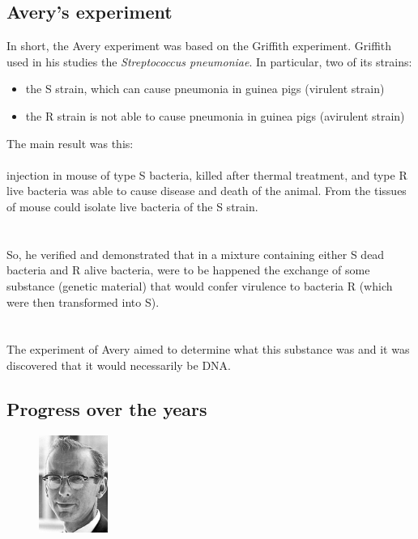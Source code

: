 \newpage

\subsection{Avery’s experiment}

In short, the Avery experiment was based on the Griffith experiment. Griffith used in his studies the \emph{Streptococcus pneumoniae}. In particular, two of its strains:

\begin{itemize}
	\item the S strain, which can cause pneumonia in guinea pigs (virulent strain)
	\item the R strain is not able to cause pneumonia in guinea pigs (avirulent strain)
\end{itemize}

The main result was this:
\\
\\injection in mouse of type S bacteria, killed after thermal treatment, and type R live bacteria was able to cause disease and death of the animal. From the tissues of mouse could isolate live bacteria of the S strain.
\\
\\
\\So, he verified and demonstrated that in a mixture containing either S dead bacteria and R alive bacteria, were to be happened the exchange of some substance (genetic material) that would confer virulence to bacteria R (which were then transformed into S).
\\
\\
\\The experiment of Avery aimed to determine what this substance was and it was discovered that it would necessarily be DNA. 

\subsection{Progress over the years}

\begin{figure} %
    \centering
    \includegraphics[width=0.2\textwidth]{../Images/RobertWHolley.jpg}
    \label{overflow}
\end{figure}

